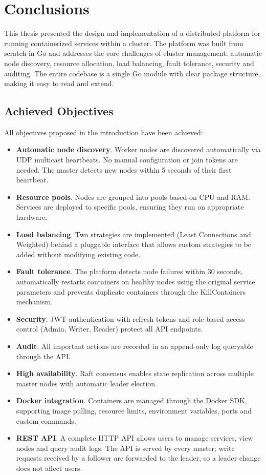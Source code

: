 \chapter{Conclusions}
\label{cap:cap5}

This thesis presented the design and implementation of a distributed platform for running containerized services within a cluster. The platform was built from scratch in Go and addresses the core challenges of cluster management: automatic node discovery, resource allocation, load balancing, fault tolerance, security and auditing. The entire codebase is a single Go module with clear package structure, making it easy to read and extend.

\section{Achieved Objectives}

All objectives proposed in the introduction have been achieved:

\begin{itemize}
    \item \textbf{Automatic node discovery}. Worker nodes are discovered automatically via UDP multicast heartbeats. No manual configuration or join tokens are needed. The master detects new nodes within 5 seconds of their first heartbeat.
    \item \textbf{Resource pools}. Nodes are grouped into pools based on CPU and RAM. Services are deployed to specific pools, ensuring they run on appropriate hardware.
    \item \textbf{Load balancing}. Two strategies are implemented (Least Connections and Weighted) behind a pluggable interface that allows custom strategies to be added without modifying existing code.
    \item \textbf{Fault tolerance}. The platform detects node failures within 30 seconds, automatically restarts containers on healthy nodes using the original service parameters and prevents duplicate containers through the KillContainers mechanism.
    \item \textbf{Security}. JWT authentication with refresh tokens and role-based access control (Admin, Writer, Reader) protect all API endpoints.
    \item \textbf{Audit}. All important actions are recorded in an append-only log queryable through the API.
    \item \textbf{High availability}. Raft consensus enables state replication across multiple master nodes with automatic leader election.
    \item \textbf{Docker integration}. Containers are managed through the Docker SDK, supporting image pulling, resource limits, environment variables, ports and custom commands.
    \item \textbf{REST API}. A complete HTTP API allows users to manage services, view nodes and query audit logs. The API is served by every master; write requests received by a follower are forwarded to the leader, so a leader change does not affect users.
\end{itemize}

